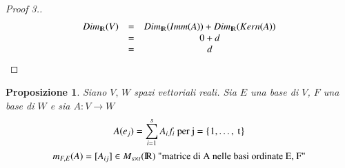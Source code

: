 \documentclass[12pt,a4paper]{article}
\theoremstyle{break}
\newtheorem{proposition}{Proposizione}[subsection]
\newcommand\R{{\rm I\!R}}
\newcommand{\Dim}[1]{Dim_{\R}(#1)}
\newcommand{\func}[3]{#1:#2\rightarrow #3}
\begin{document}
    \begin{proof}[Proof 3.]
        \[
            \begin{matrix}
                \Dim{V} & = & \Dim{Imm(A)} + \Dim{Kern(A)} \\
                & = & 0 + d \\
                & = & d
            \end{matrix}
        \]
    \end{proof}
    \begin{proposition}
        Siano $V,\, W$ spazi vettoriali reali. Sia $E$ una base di $V$, $F$ una base di $W$ e sia $\func{A}{V}{W}$
        \[A(e_j) = \sum_{i=1}^s A_if_i \text{ per j = \{1,\,$\dots$,\, t\}}\]
        \[m_{F,E}(A) = [A_{ij}]\in M_{s\times t}(\R) \text{ "matrice di A nelle basi ordinate E, F"}\]
    \end{proposition}
\end{document}
